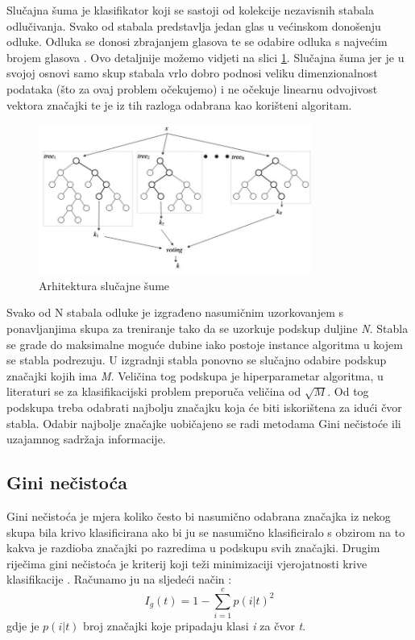 Slučajna šuma \cite{breiman} je klasifikator koji se sastoji od kolekcije nezavisnih stabala odlučivanja. Svako od stabala predstavlja jedan glas u većinskom donošenju odluke. Odluka se donosi zbrajanjem glasova te se odabire odluka s najvećim brojem glasova \cite{rfdef}. Ovo detaljnije možemo vidjeti na slici \ref{fig:rf}. Slučajna šuma jer je u svojoj osnovi samo skup stabala vrlo dobro podnosi veliku dimenzionalnost podataka (što za ovaj problem očekujemo) i ne očekuje linearnu odvojivost vektora značajki te je iz tih razloga odabrana kao korišteni algoritam.  \\

\begin{figure}[H]
	\centering
	\includegraphics[width=0.8\textwidth]{fig/random-forest-overview.jpg}
	\caption{Arhitektura slučajne šume \cite{fig-rf}}
	\label{fig:rf}
\end{figure}

	
	Svako od N stabala odluke je izgrađeno nasumičnim uzorkovanjem s ponavljanjima skupa za treniranje tako da se uzorkuje podskup duljine \textit{N}. Stabla se grade do maksimalne moguće dubine iako postoje instance algoritma u kojem se stabla podrezuju. U izgradnji stabla ponovno se slučajno odabire podskup značajki kojih ima \textit{M}. Veličina tog podskupa je hiperparametar algoritma, u literaturi \cite{statisticallearning} se za klasifikacijski problem preporuča veličina od $\sqrt{M}$. Od tog podskupa treba odabrati najbolju značajku koja će biti iskorištena za idući čvor stabla. Odabir najbolje značajke uobičajeno se radi metodama Gini nečistoće ili uzajamnog sadržaja informacije.
	
\subsection{Gini nečistoća}

Gini nečistoća je mjera koliko često bi nasumično odabrana značajka iz nekog skupa bila krivo klasificirana ako bi ju se nasumično klasificiralo s obzirom na to kakva je razdioba značajki po razredima u podskupu svih značajki. Drugim riječima gini nečistoća je kriterij koji teži minimizaciji vjerojatnosti krive klasifikacije \cite{cse}. Računamo ju na sljedeći način \cite{gidef}:
\begin{equation}
	I_g(t) = 1 -  \sum_{i=1}^{c} p(i | t)^{2}
\end{equation}
gdje je $p(i | t)$ broj značajki koje pripadaju klasi \textit{i} za čvor \textit{t}. 

